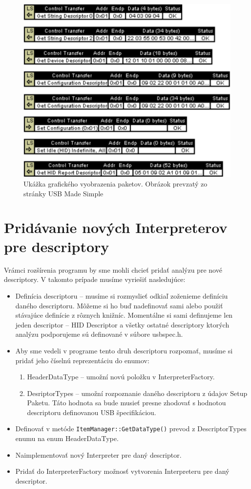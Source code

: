 \begin{figure}[!htb]
	\centering
	\includegraphics[width=12cm]{img/kap05_graphics_packets}
	\caption{Ukážka grafického vyobrazenia paketov. Obrázok prevzatý zo stránky USB Made Simple~\cite{usbmadesimple_graphics}}
	\label{obr:kap5:graphics_packets}
\end{figure}

\newpage
\section{Pridávanie nových Interpreterov pre descriptory}
Vrámci rozšírenia programu by sme mohli chcieť pridať analýzu pre nové descriptory. V takomto prípade musíme vyriešiť nasledujúce:
\begin{itemize}
\item Definícia descriptoru -- musíme si rozmyslieť odkiaľ zoženieme definíciu daného descriptoru. Môžeme si ho buď nadefinovať sami alebo použiť stávajúce definície z rôznych knižníc. Momentálne si sami definujeme len jeden descriptor -- HID Descriptor a všetky ostatné descriptory ktorých analýzu podporujeme sú definované v súbore usbspec.h.
\item Aby sme vedeli v programe tento druh descriptoru rozpoznať, musíme si pridať jeho číselnú reprezentáciu do enumov:
\begin{enumerate}
\item HeaderDataType -- umožní novú položku v InterpreterFactory.
\item DesriptorTypes -- umožní rozpoznanie daného descriptoru z údajov Setup Paketu. Táto hodnota sa bude musieť presne zhodovať s hodnotou descriptoru definovanou USB špecifikáciou.
\end{enumerate}
\item Definovať v metóde \texttt{ItemManager::GetDataType()} prevod z DescriptorTypes enumu na enum HeaderDataType.
\item Naimplementovať nový Interpreter pre daný descriptor.
\item Pridať do InterpreterFactory možnosť vytvorenia Interpreteru pre daný descriptor.
\end{itemize}
